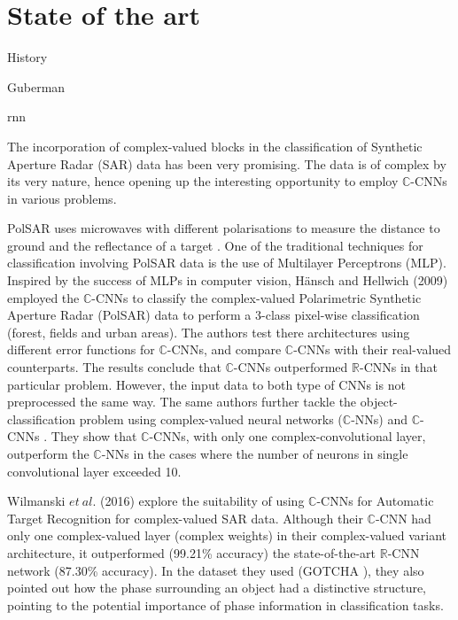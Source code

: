 \chapter{State of the art}\label{chap:comp}

History


Guberman

rnn
 





The incorporation of complex-valued blocks in the classification of Synthetic Aperture Radar (SAR) data has been very promising. The data is of complex by its very nature, hence opening up the interesting opportunity to employ $\mathbb{C}$-CNNs in various problems.

PolSAR uses microwaves with different polarisations to measure
the distance to ground and the reflectance of a target \cite{hansch2009classification}. One of the traditional techniques for classification involving PolSAR data is the use of Multilayer Perceptrons (MLP). Inspired by the success of MLPs in computer vision, H\"{a}nsch and Hellwich (2009) \cite{hansch2009classification} employed the $\mathbb{C}$-CNNs to classify the complex-valued Polarimetric Synthetic Aperture Radar (PolSAR) data to perform a 3-class pixel-wise classification (forest, fields and urban areas). The authors test there architectures using different error functions for $\mathbb{C}$-CNNs, and compare $\mathbb{C}$-CNNs with their real-valued counterparts. The results conclude that $\mathbb{C}$-CNNs outperformed $\mathbb{R}$-CNNs in that particular problem. However, the input data to both type of CNNs is not preprocessed the same way. The same authors further tackle the object-classification problem using complex-valued neural networks ($\mathbb{C}$-NNs) and $\mathbb{C}$-CNNs \cite{hansch2010complex}. They show that $\mathbb{C}$-CNNs, with only one complex-convolutional layer, outperform the $\mathbb{C}$-NNs in the cases where the number of neurons in single convolutional layer exceeded 10. 

Wilmanski $et \ al.$ (2016) \cite{wilmanski2016complex} explore the suitability of using $\mathbb{C}$-CNNs for Automatic Target Recognition for complex-valued SAR data. Although their $\mathbb{C}$-CNN had only one complex-valued layer (complex weights) in their complex-valued variant architecture, it outperformed (99.21\% accuracy) the state-of-the-art $\mathbb{R}$-CNN network (87.30\% accuracy). In the dataset they used (GOTCHA \cite{gotcha}), they also pointed out how the phase surrounding an object had a distinctive structure, pointing to the potential importance of phase information in classification tasks.

